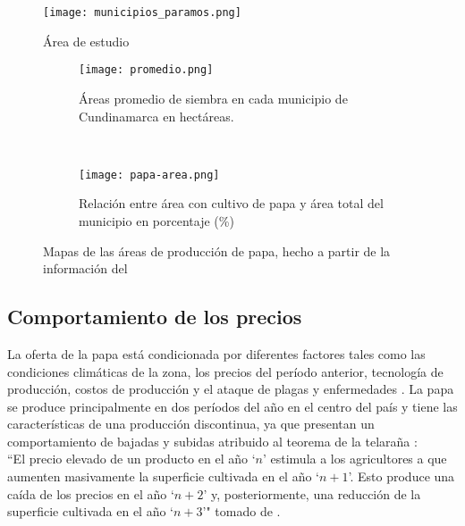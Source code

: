 \begin{figure}[H]
	\begin{center}
		\texttt{[image: municipios\_paramos.png]}
		\label{gra:areas_paramo}
	\end{center}
    	\caption{Área de estudio}
	\label{gra:areas}
\end{figure}
	

\begin{figure}[H]
	\begin{center}
		\begin{subfigure}[normla]{0.4\textwidth}
		\caption{Áreas promedio de siembra en cada municipio de Cundinamarca en hectáreas.}
	\texttt{[image: promedio.png]}
		\label{subfig:a1}
		\end{subfigure}
		~
				\begin{subfigure}[normla]{0.4\textwidth}
		\caption{Relación entre área con cultivo de papa y área total del municipio en porcentaje (\%)}		
		\texttt{[image: papa-area.png]}
		\label{subfig:a2}
		\end{subfigure}

	\end{center}
	\caption{Mapas de las áreas de producción de papa, hecho a partir de la información del \citet{madr2017}}
	\label{gra:areas_promedio}	
\end{figure}


\subsection{Comportamiento de los precios}

La oferta de la papa está condicionada por diferentes factores tales como las condiciones climáticas de la zona, los precios del período anterior, tecnología de producción, costos de producción y el ataque de plagas y enfermedades \citep{Barrientos2014}. La papa se produce principalmente en dos períodos del año en el centro del país y tiene las características de una producción discontinua, ya que presentan un comportamiento de bajadas y subidas atribuido al teorema de la telaraña \citep{BarrientosF.2011, Ezekiel1938}:\\


``El precio elevado de un producto en el año `$n$' estimula a los agricultores a que aumenten masivamente la superficie cultivada en el año `$n+1$'. Esto produce una caída de los precios en el año `$n+2$' y, posteriormente, una reducción de la superficie cultivada en el año `$n+3$'" tomado de \citet{Cartay1999}.\\

